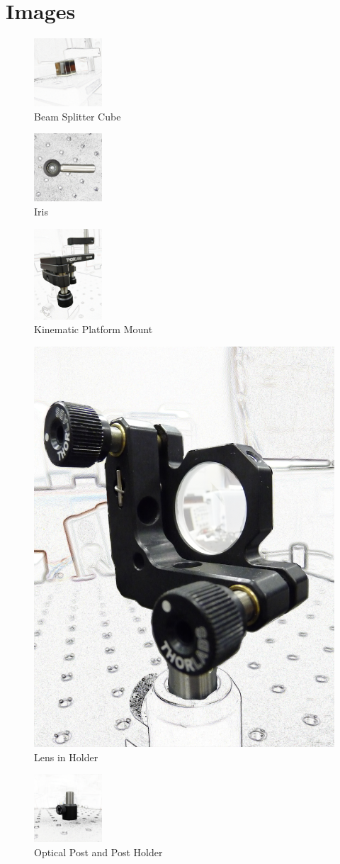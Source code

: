 \section{Images}
\graphicspath{{./images/}}

\begin{figure}[ht]
\centering
\includegraphics[width=1in]{BeamSplitterCube}
\caption{Beam Splitter Cube}
\label{fig:beamsplittercube}
\end{figure}

\begin{figure}[ht]
\centering
\includegraphics[width=1in]{Iris}
\caption{Iris}
\label{fig:iris}
\end{figure}

\begin{figure}[ht]
\centering
\includegraphics[width=1in]{KinematicPlatformMount}
\caption{Kinematic Platform Mount}
\label{fig:kinematicplatformmount}
\end{figure}

\begin{figure}[ht]
\centering
\includegraphics[width=.8 in]{LensinHolder}
\caption{Lens in Holder}
\label{fig:lens}
\end{figure}

\begin{figure}[ht]
\centering
\includegraphics[width=1in]{OpticalPostwPostHolder}
\caption{Optical Post and Post Holder}
\label{fig:opticalpost_postholder}
\end{figure}

